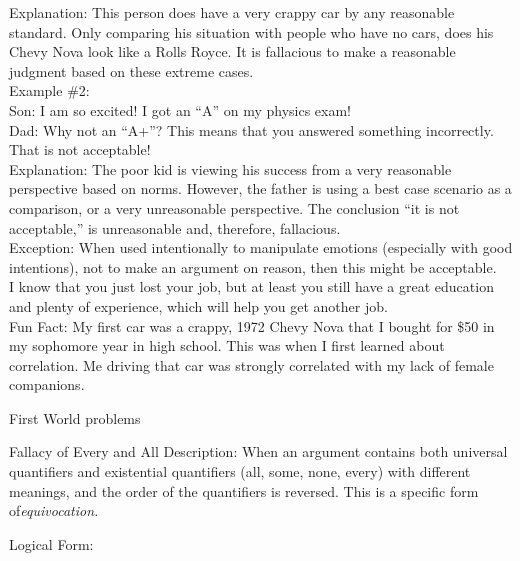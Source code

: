 \documentclass[a4paper,12pt,single,pdftex]{scrartcl}
\begin{document}
{    
      Explanation: This person does have a very crappy car by any reasonable standard.  Only comparing his situation with people who have no cars, does his Chevy Nova look like a Rolls Royce.  It is fallacious to make a reasonable judgment based on these extreme cases.
    \\

    
      Example \#2:
    \\

    
      Son: I am so excited!  I got an “A” on my physics exam!
    \\

    
      Dad:  Why not an “A+”?  This means that you answered something incorrectly.  That is not acceptable!
    \\

    
      Explanation: The poor kid is viewing his success from a very reasonable perspective based on norms.  However, the father is using a best case scenario as a comparison, or a very unreasonable perspective.  The conclusion “it is not acceptable,” is unreasonable and, therefore, fallacious.
    \\

    
      Exception: When used intentionally to manipulate emotions (especially with good intentions), not to make an argument on reason, then this might be acceptable.
    \\

    
      I know that you just lost your job, but at least you still have a great education and plenty of experience, which will help you get another job.
    \\

    
      Fun Fact: My first car was a crappy, 1972 Chevy Nova that I bought for \$50 in my sophomore year in high school. This was when I first learned about correlation. Me driving that car was strongly correlated with my lack of female companions.
    \\

  }


First World problems

Fallacy of Every and All
    Description: When an argument contains both universal quantifiers and existential quantifiers (all, some, none, every) with different meanings, and the order of the quantifiers is reversed. This is a specific form of{\it  equivocation. \newline
}

    
      Logical Form:
    \\
\end{document}
